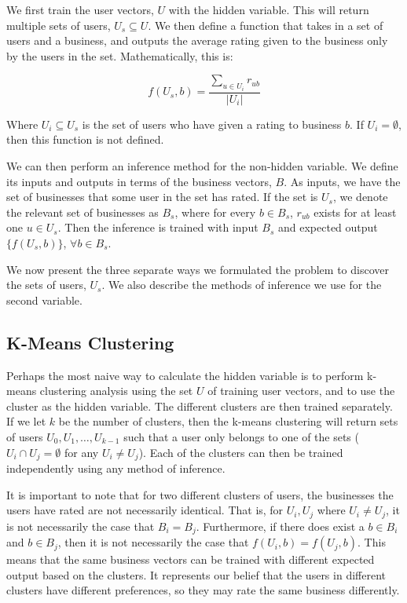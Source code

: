 \documentclass[11pt]{article}
\begin{document}
We first train the user vectors, $U$ with the hidden variable. This will return multiple sets of users, $U_s \subseteq U$.  We then define a function that takes in a set of users and a business, and outputs the average rating given to the business only by the users in the set. Mathematically, this is:

\begin{equation}
\label{basic}
f(U_s, b) = \frac{\sum\limits_{u \in U_i} r_{ub}}{|U_i|}
\end{equation}

Where $U_i \subseteq U_s$ is the set of users who have given a rating to business $b$. If $U_i = \emptyset$, then this function is not defined. 

We can then perform an inference method for the non-hidden variable.  We define its inputs and outputs in terms of the business vectors, $B$. As inputs, we have the set of businesses that some user in the set has rated. If the set is $U_s$, we denote the relevant set of businesses as $B_s$, where for every $b \in B_s$, $r_{ub}$ exists for at least one $u \in U_s$. Then the inference is trained with input $B_s$ and expected output $\{f(U_s, b)\}$, $\forall b \in B_s$.

We now present the three separate ways we formulated the problem to discover the sets of users, $U_s$. We also describe the methods of inference we use for the second variable.

\subsection{K-Means Clustering}
Perhaps the most naive way to calculate the hidden variable is to perform k-means clustering analysis using the set $U$ of training user vectors, and to use the cluster as the hidden variable. The different clusters are then trained separately. If we let $k$ be the number of clusters, then the k-means clustering will return sets of users $U_0, U_1, \ldots, U_{k-1}$ such that a user only belongs to one of the sets ($U_i \cap U_j = \emptyset$ for any $U_i \neq U_j$). Each of the clusters can then be trained independently using any method of inference.

It is important to note that for two different clusters of users, the businesses the users have rated are not necessarily identical. That is, for $U_i, U_j$ where $U_i \neq U_j$, it is not necessarily the case that $B_i = B_j$. Furthermore, if there does exist a $b \in B_i$ and $b \in B_j$, then it is not necessarily the case that $f(U_i, b) = f(U_j, b)$. This means that the same business vectors can be trained with different expected output based on the clusters. It represents our belief that the users in different clusters have different preferences, so they may rate the same business differently. 
\end{document}
